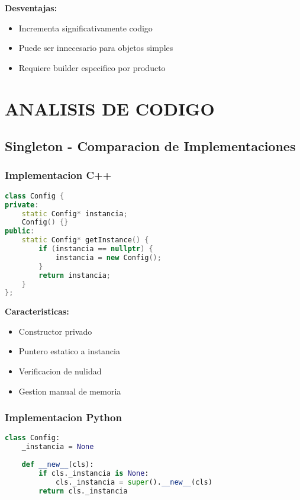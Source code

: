 \documentclass[11pt,a4paper]{article}
\begin{document}
\textbf{Desventajas:}
\begin{itemize}
    \item Incrementa significativamente codigo
    \item Puede ser innecesario para objetos simples
    \item Requiere builder especifico por producto
\end{itemize}

\section{ANALISIS DE CODIGO}

\subsection{Singleton - Comparacion de Implementaciones}

\subsubsection{Implementacion C++}

\begin{lstlisting}[language=C++]
class Config {
private:
    static Config* instancia;
    Config() {}
public:
    static Config* getInstance() {
        if (instancia == nullptr) {
            instancia = new Config();
        }
        return instancia;
    }
};
\end{lstlisting}

\textbf{Caracteristicas:}
\begin{itemize}
    \item Constructor privado
    \item Puntero estatico a instancia
    \item Verificacion de nulidad
    \item Gestion manual de memoria
\end{itemize}

\subsubsection{Implementacion Python}

\begin{lstlisting}[language=Python]
class Config:
    _instancia = None
    
    def __new__(cls):
        if cls._instancia is None:
            cls._instancia = super().__new__(cls)
        return cls._instancia
\end{lstlisting}
\end{document}
